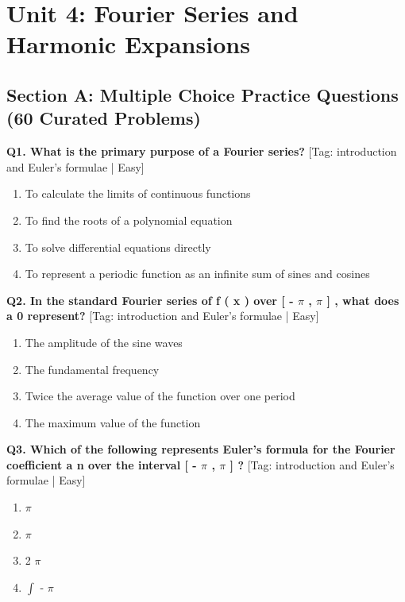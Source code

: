 \chapter{Unit 4: Fourier Series and Harmonic Expansions}

\section{Section A: Multiple Choice Practice Questions (60 Curated Problems)}

\noindent\textbf{Q1. What is the primary purpose of a Fourier series?} \hfill [Tag: introduction and Euler's formulae | Easy]
\begin{enumerate}[label=(\alph*),topsep=2pt,itemsep=1pt,partopsep=0pt,parsep=0pt]
    \item {{To calculate the limits of continuous functions}}
    \item {{To find the roots of a polynomial equation}}
    \item {{To solve differential equations directly}}
    \item {{To represent a periodic function as an infinite sum of sines and cosines}}
\end{enumerate}
\vspace{2mm}

\noindent\textbf{Q2. In the standard Fourier series of f ( x ) over [ - $\pi$ , $\pi$ ] , what does a 0 represent?} \hfill [Tag: introduction and Euler's formulae | Easy]
\begin{enumerate}[label=(\alph*),topsep=2pt,itemsep=1pt,partopsep=0pt,parsep=0pt]
    \item {{The amplitude of the sine waves}}
    \item {{The fundamental frequency}}
    \item {{Twice the average value of the function over one period}}
    \item {{The maximum value of the function}}
\end{enumerate}
\vspace{2mm}

\noindent\textbf{Q3. Which of the following represents Euler's formula for the Fourier coefficient a n over the interval [ - $\pi$ , $\pi$ ] ?} \hfill [Tag: introduction and Euler's formulae | Easy]
\begin{enumerate}[label=(\alph*),topsep=2pt,itemsep=1pt,partopsep=0pt,parsep=0pt]
    \item {{$\pi$}}
    \item {{$\pi$}}
    \item {{2 $\pi$}}
    \item {{$\int$ - $\pi$}}
\end{enumerate}
\vspace{2mm}

